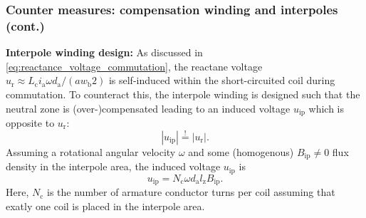 \begin{frame}
	\frametitle{Counter measures: compensation winding and interpoles (cont.)}
	\textbf{Interpole winding design:}
	As discussed in \eqref{eq:reactance_voltage_commutation}, the reactane voltage $u_\mathrm{r} \approx  L_\mathrm{c} i_\mathrm{a} \omega d_\mathrm{a} / (a w_\mathrm{b}2)$ is self-induced within the short-circuited coil during commutation. To counteract this, the interpole winding is designed such that the neutral zone is (over-)compensated leading to an induced voltage $u_\mathrm{ip}$ which is opposite to $u_\mathrm{r}$:
	\begin{equation}
		|u_\mathrm{ip}| \stackrel{!}{=} |u_\mathrm{r}|.
		\label{eq:Interpole_voltage_condition}
	\end{equation} \pause
	Assuming a rotational angular velocity $\omega$ and some (homogenous) $B_\mathrm{ip}\neq 0$ flux density in the interpole area, the induced voltage $u_\mathrm{ip}$ is
	\begin{equation}
		u_\mathrm{ip} =  N_\mathrm{c} \omega d_\mathrm{a} l_\mathrm{z} B_\mathrm{ip}.
		\label{eq:Induced_voltage_interpole}
	\end{equation}
	Here, $N_\mathrm{c}$ is the number of armature conductor turns per coil assuming that exatly one coil is placed in the interpole area.
\end{frame}

